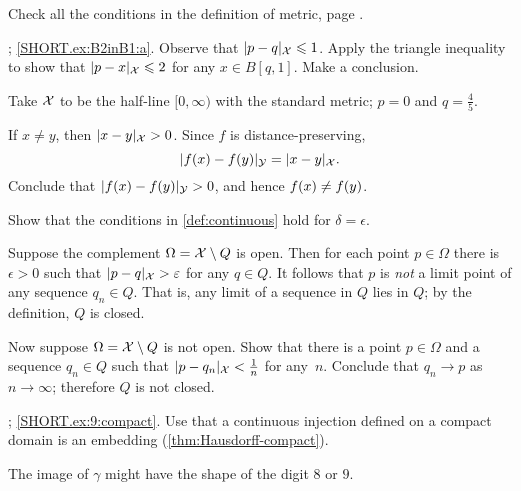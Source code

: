 \setcounter{eqtn}{0}

\raggedcolumns\setlength{\multicolsep}{-0mm}
\begin{multicols}{2}

 Check all the conditions in the definition of metric, page \pageref{page:def:metric}.

\parbf{\ref{ex:B2inB1}}; \ref{SHORT.ex:B2inB1:a}.
Observe that $\dist{p}{q}{\spc{X}}\le 1$. 
Apply the triangle inequality to show that $\dist{p}{x}{\spc{X}}\le 2$ for any $x\in B[q,1]$.
Make a conclusion.

Take $\mathcal{X}$ to be the half-line $[0,\infty)$ with the standard metric; $p=0$ and $q=\tfrac45$.

If $x\ne y$, then $\dist{x}{y}{\spc{X}}>0$.
Since $f$ is distance-preserving,
$$\dist{f(x)}{f(y)}{\spc{Y}}=\dist{x}{y}{\spc{X}}.$$
Conclude that $\dist{f(x)}{f(y)}{\spc{Y}}>0$, and hence $f(x)\z\ne f(y)$.

Show that the conditions in \ref{def:continuous} hold for $\delta=\epsilon$.

Suppose the complement $\Omega=\mathcal{X}\setminus Q$ is open.
Then for each point $p\in \Omega$ there is $\epsilon>0$ such that $\dist{p}{q}{\spc{X}}>\epsilon$ for any $q\in Q$.
It follows that $p$ is \textit{not} a limit point of any sequence $q_n\in Q$.
That is, any limit of a sequence in $Q$ lies in $Q$;
by the definition, $Q$ is closed.

Now suppose $\Omega=\mathcal{X}\setminus Q$ is not open.
Show that there is a point $p\in \Omega$ and a sequence $q_n\in Q$ such that $\dist{p}{q_n}{\spc{X}}\z<\tfrac 1n$ for any~$n$.
Conclude that $q_n\to p$ as $n\to \infty$;
therefore $Q$ is not closed.


\setcounter{eqtn}{0}

\parbf{\ref{ex:9}}; \ref{SHORT.ex:9:compact}. Use that a continuous injection defined on a compact domain is an embedding (\ref{thm:Hausdorff-compact}). 

 The image of $\gamma$ might have the shape of the digit $8$ or $9$.


\end{multicols}

